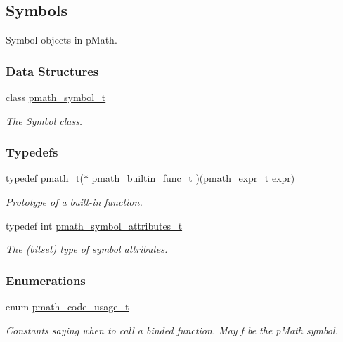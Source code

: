 \hypertarget{group__symbols}{
\subsection{Symbols}
\label{group__symbols}
}
Symbol objects in pMath.  


\subsubsection*{Data Structures}
\begin{CompactItemize}
\item 
class \hyperlink{classpmath__symbol__t}{pmath\_\-symbol\_\-t}
\begin{CompactList}\small\item\em The Symbol class. \item\end{CompactList}\end{CompactItemize}
\subsubsection*{Typedefs}
\begin{CompactItemize}
\item 
typedef \hyperlink{classpmath__t}{pmath\_\-t}($\ast$ \hyperlink{group__symbols_g4a74d7aeade34fc26c04ffde22ab1a1a}{pmath\_\-builtin\_\-func\_\-t} )(\hyperlink{classpmath__expr__t}{pmath\_\-expr\_\-t} expr)
\begin{CompactList}\small\item\em Prototype of a built-in function. \item\end{CompactList}\item 
typedef int \hyperlink{group__symbols_g5d508ec0d32d617b6c642de54907ee17}{pmath\_\-symbol\_\-attributes\_\-t}
\begin{CompactList}\small\item\em The (bitset) type of symbol attributes. \item\end{CompactList}\end{CompactItemize}
\subsubsection*{Enumerations}
\begin{CompactItemize}
\item 
enum \hyperlink{group__symbols_g957dfb51b09e821a8fc052835ea66670}{pmath\_\-code\_\-usage\_\-t} 
\begin{CompactList}\small\item\em Constants saying when to call a binded function. May f be the pMath symbol. \item\end{CompactList}\end{CompactItemize}
